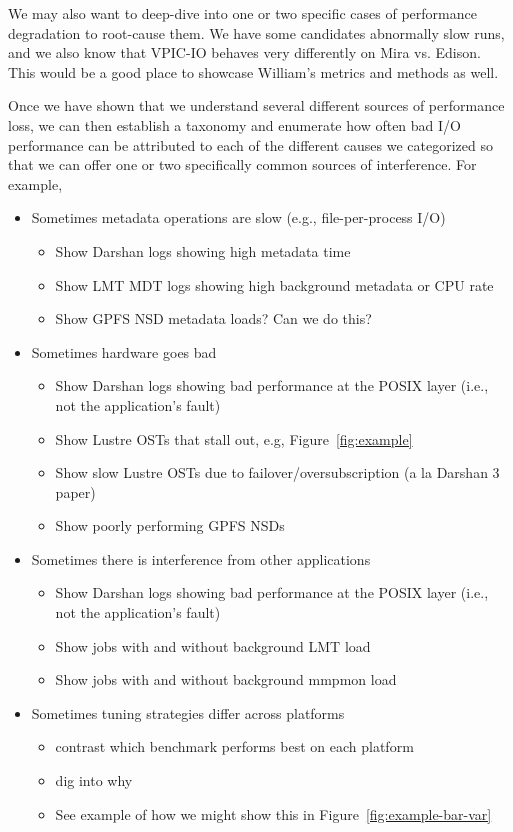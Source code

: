 \documentclass[conference,10pt,compsocconf]{IEEEtran}
\begin{document}
We may also want to deep-dive into one or two specific cases of performance
degradation to root-cause them.  We have some candidates abnormally slow runs,
and we also know that VPIC-IO behaves very differently on Mira vs. Edison.
This would be a good place to showcase William's metrics and methods as well.

Once we have shown that we understand several different sources of performance
loss, we can then establish a taxonomy and enumerate how often bad I/O
performance can be attributed to each of the different causes we categorized so
that we can offer one or two specifically common sources of interference.  For
example,

\begin{itemize}
\item Sometimes metadata operations are slow (e.g., file-per-process I/O)
    \begin{itemize}
    \item Show Darshan logs showing high metadata time
    \item Show LMT MDT logs showing high background metadata or CPU rate
    \item Show GPFS NSD metadata loads?  Can we do this?
    \end{itemize}
\item Sometimes hardware goes bad
    \begin{itemize}
    \item Show Darshan logs showing bad performance at the POSIX layer (i.e., not the
    application's fault)
    \item Show Lustre OSTs that stall out, e.g, Figure~\ref{fig:example}
    \item Show slow Lustre OSTs due to failover/oversubscription (a la Darshan 3 paper)
    \item Show poorly performing GPFS NSDs
    \end{itemize}
\item Sometimes there is interference from other applications
    \begin{itemize}
    \item Show Darshan logs showing bad performance at the POSIX layer (i.e., not the
    application's fault)
    \item Show jobs with and without background LMT load
    \item Show jobs with and without background mmpmon load
    \end{itemize}
\item Sometimes tuning strategies differ across platforms
    \begin{itemize}
    \item contrast which benchmark performs best on each platform
    \item dig into why
    \item See example of how we might show this in Figure~\ref{fig:example-bar-var}
    \end{itemize}
\end{itemize}
\end{document}
